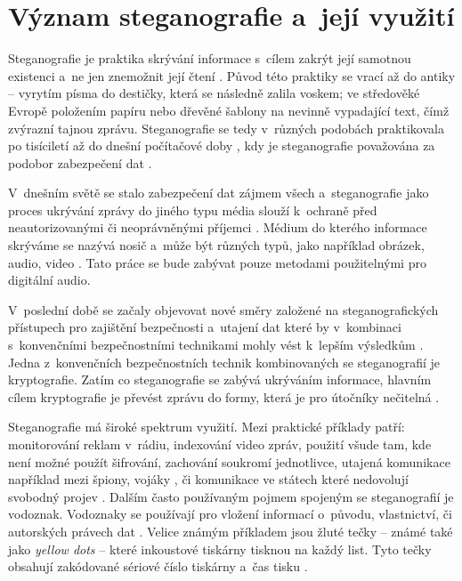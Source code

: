\section{Význam steganografie a~její využití}
\label{sec:motivation-and-uses}

Steganografie je praktika skrývání informace s~cílem zakrýt její samotnou
existenci a~ne jen znemožnit její čtení
\cite{AlSabhany2020}\cite{Anderson1998}\cite{Djebbar2012}\cite{Dutta2020}.
Původ této praktiky se vrací až do antiky -- vyrytím písma do destičky, která
se následně zalila voskem; ve středověké Evropě položením papíru nebo dřevěné
šablony na nevinně vypadající text, čímž zvýrazní tajnou zprávu. Steganografie
se tedy v~různých podobách praktikovala po tisíciletí až do dnešní počítačové
doby \cite{Anderson1998}, kdy je steganografie považována za podobor
zabezpečení dat \cite{Djebbar2012}.

V~dnešním světě se stalo zabezpečení dat zájmem všech a~steganografie jako
proces ukrývání zprávy do jiného typu média slouží k~ochraně před
neautorizovanými či neoprávněnými příjemci \cite{Dutta2020}. Médium do kterého
informace skrýváme se nazývá nosič a~může být různých typů, jako například
obrázek, audio, video \cite{Dutta2020}. Tato práce se bude zabývat pouze
metodami použitelnými pro digitální audio.

V~poslední době se začaly objevovat nové směry založené na steganografických
přístupech pro zajištění bezpečnosti a~utajení dat které by v~kombinaci
s~konvenčními bezpečnostními technikami mohly vést k~lepším výsledkům
\cite{Djebbar2012}. Jedna z~konvenčních bezpečnostních technik kombinovaných se
steganografií je kryptografie. Zatím co steganografie se zabývá ukrýváním
informace, hlavním cílem kryptografie je převést zprávu do formy, která je pro
útočníky nečitelná \cite{AlSabhany2020}.

Steganografie má široké spektrum využití. Mezi praktické příklady patří:
monitorování reklam v~rádiu, indexování video zpráv, použití všude tam, kde
není možné použít šifrování, zachování soukromí jednotlivce, utajená komunikace
například mezi špiony, vojáky \cite{Dutta2020}, či komunikace ve státech které
nedovolují svobodný projev \cite{Anderson1998}. Dalším často používaným pojmem
spojeným se steganografií je vodoznak. Vodoznaky se používají pro vložení
informací o~původu, vlastnictví, či autorských právech dat
\cite{Anderson1998}\cite{Djebbar2012}\cite{Dutta2020}. Velice známým příkladem
jsou žluté tečky -- známé také jako \textit{yellow dots} -- které inkoustové
tiskárny tisknou na každý list. Tyto tečky obsahují zakódované sériové číslo
tiskárny a~čas tisku \cite{Dutta2020}.

